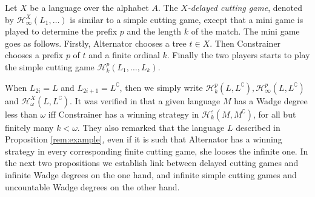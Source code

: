 Let $X$ be a language over the alphabet $A$.  The \emph{$X$-delayed cutting game}, denoted by 
$\mathcal{H}^{X}_\infty(L_1,\dots)$ is similar to a simple cutting game, except that a mini game is played to determine the prefix $p$ and the length $k$ of the match. 
The mini game goes as follows. Firstly, Alternator chooses a tree $t \in X$. Then Constrainer chooses a prefix $p$ of $t$ and a finite ordinal $k$. Finally the two players starts to play the simple cutting game $\mathcal{H}^p_k(L_1,\dots,L_k)$. 

When $L_{2i}=L$ and $L_{2i+1}=L^\complement$, then we simply write $\mathcal{H}^p_k(L, L^\complement), \mathcal{H}^p_\infty(L, L^\complement)$ and  $\mathcal{H}^{X}_\omega(L, L^\complement)$.
It was verified in \cite{bp} that a given language $M$ has a Wadge degree less than $\omega$ iff Constrainer has a winning strategy in $\mathcal{H}^\varepsilon_k(M, M^\complement)$, for all but finitely many $k<\omega$.
They also remarked that the language $L$ described in Proposition \ref{rem:example}, even  if it is such that Alternator has a winning strategy in every corresponding finite cutting game, she looses the infinite one.
In the next two propositions we establish link between delayed cutting games and infinite Wadge degrees on the one hand, and infinite simple cutting games and uncountable Wadge degrees on the other hand.


